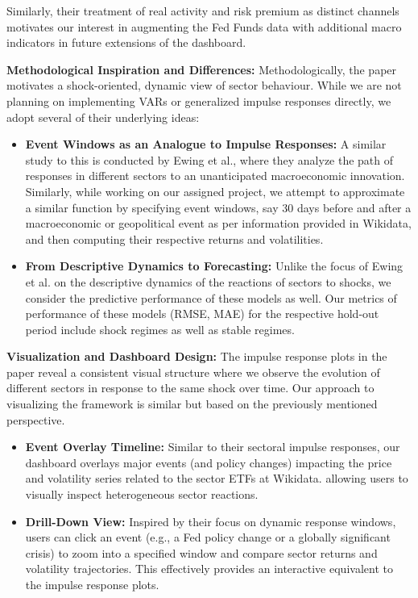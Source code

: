 \documentclass{article}
\begin{document}
\noindent Similarly, their treatment of real activity and risk premium as distinct channels motivates our interest in augmenting the Fed Funds data with additional macro indicators in future extensions of the dashboard.

\vspace{0.5em}

\noindent \textbf{Methodological Inspiration and Differences:}  
Methodologically, the paper motivates a shock-oriented, dynamic view of sector behaviour. While we are not planning on implementing VARs or generalized impulse responses directly, we adopt several of their underlying ideas:

\begin{itemize}
    \item \textbf{Event Windows as an Analogue to Impulse Responses:}  
    A similar study to this is conducted by Ewing et al., where they analyze the path of responses in different sectors to an unanticipated macroeconomic innovation. Similarly, while working on our assigned project, we attempt to approximate a similar function by specifying event windows, say 30 days before and after a macroeconomic or geopolitical event as per information provided in Wikidata, and then computing their respective returns and volatilities.

    \item \textbf{From Descriptive Dynamics to Forecasting:}  
    Unlike the focus of Ewing et al. on the descriptive dynamics of the reactions of sectors to shocks, we consider the predictive performance of these models as well. Our metrics of performance of these models (RMSE, MAE) for the respective hold-out period include shock regimes as well as stable regimes.

\end{itemize}


\vspace{0.5em}

\noindent \textbf{Visualization and Dashboard Design:}  
The impulse response plots in the paper reveal a consistent visual structure where we observe the evolution of different sectors in response to the same shock over time. Our approach to visualizing the framework is similar but based on the previously mentioned perspective.

\begin{itemize}
    \item \textbf{Event Overlay Timeline:} Similar to their sectoral impulse responses, our dashboard overlays major events (and policy changes) impacting the price and volatility series related to the sector ETFs at Wikidata. allowing users to visually inspect heterogeneous sector reactions.
    
    \item \textbf{Drill-Down View:} Inspired by their focus on dynamic response windows, users can click an event (e.g., a Fed policy change or a globally significant crisis) to zoom into a specified window and compare sector returns and volatility trajectories. This effectively provides an interactive equivalent to the impulse response plots.
\end{itemize}
\end{document}
